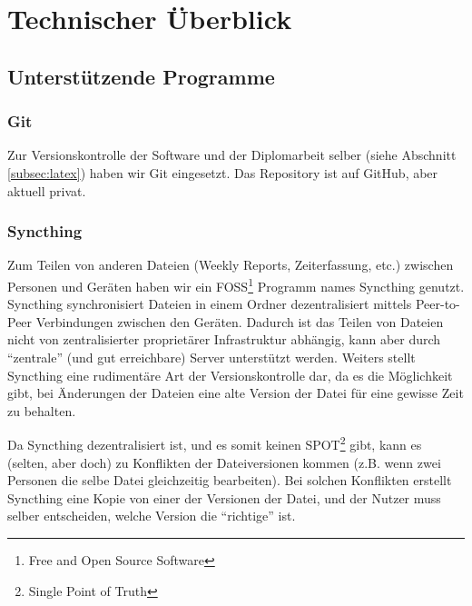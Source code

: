 
\chapter{Technischer Überblick}
\label{sec:ueberblick}


\section{Unterstützende Programme}
\label{subsec:ueberblick_programs}

\subsection{Git}
Zur Versionskontrolle der Software und der Diplomarbeit selber (siehe Abschnitt \ref{subsec:latex}) haben wir Git eingesetzt.
%
Das Repository ist auf GitHub, aber aktuell privat.

\subsection{Syncthing}
Zum Teilen von anderen Dateien (Weekly Reports, Zeiterfassung, etc.) zwischen Personen und Geräten
haben wir ein FOSS\footnote{Free and Open Source Software} Programm names Syncthing \cite{syncthing} genutzt.
%
Syncthing synchronisiert Dateien in einem Ordner dezentralisiert mittels Peer-to-Peer Verbindungen zwischen den Geräten.
%
Dadurch ist das Teilen von Dateien nicht von zentralisierter proprietärer Infrastruktur abhängig,
kann aber durch ``zentrale'' (und gut erreichbare) Server unterstützt werden.
%
Weiters stellt Syncthing eine rudimentäre Art der Versionskontrolle dar,
da es die Möglichkeit gibt,
bei Änderungen der Dateien eine alte Version der Datei für eine gewisse Zeit zu behalten.


Da Syncthing dezentralisiert ist,
und es somit keinen SPOT\footnote{Single Point of Truth} gibt,
kann es (selten, aber doch) zu Konflikten der Dateiversionen kommen (z.B. wenn zwei Personen die selbe Datei gleichzeitig bearbeiten). 
%
Bei solchen Konflikten erstellt Syncthing eine Kopie von einer der Versionen der Datei,
und der Nutzer muss selber entscheiden,
welche Version die ``richtige'' ist.

